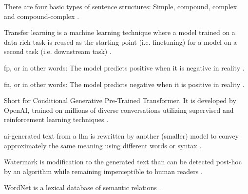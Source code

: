 \begin{definition}
    There are four basic types of sentence structures: Simple, compound, complex and compound-complex \cite{kurt_pehlivanoglu_comparative_2024}.
\end{definition}

\begin{definition}
    Transfer learning is a machine learning technique where a model trained on a data-rich task is 
    reused as the starting point (i.e. finetuning) for a model on a second task (i.e. downstream task) \cite{palivela_optimization_2021}.
\end{definition}

\begin{definition}
    \ac{fp}, or in other words: The model predicts positive when it is negative in reality \cite{palivela_optimization_2021}.
\end{definition}

\begin{definition}
    \ac{fn}, or in other words: The model predicts negative when it is positive in reality \cite{palivela_optimization_2021}.
\end{definition}

\begin{definition}
    [ChatGPT]
    Short for Conditional Generative Pre-Trained Transformer.
    It is developed by OpenAI, trained on millions of diverse conversations utilizing supervised and reinforcement learning techniques \cite{kurt_pehlivanoglu_comparative_2024}.
\end{definition}

\begin{definition}
    \ac{ai}-generated text from a \ac{llm} is rewritten by another (smaller) model to convey approximately the same meaning using different words or syntax \cite{krishna_paraphrasing_2023}.
\end{definition}

\begin{definition}
    [Watermark]
    Watermark is modification to the generated text than can be detected post-hoc by an algorithm while remaining imperceptible to human readers \cite{krishna_paraphrasing_2023}.
\end{definition}

\begin{definition}
    [WordNet]
    WordNet is a lexical database of semantic relations \cite{zhou_paraphrase_2025}.
\end{definition}


